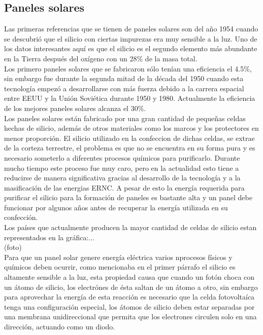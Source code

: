 \subsection{Paneles solares}
Las primeras referencias que se tienen de paneles solares son del año 1954 cuando se descubrió que el silicio con ciertas impurezas era muy sensible a la luz. Uno de los datos interesantes aquí es que el silicio es el segundo elemento más abundante en la Tierra después del oxígeno con un 28\% de la masa total\cite{panel:1}.\\

Los primero paneles solares que se fabricaron sólo tenían una eficiencia el 4.5\%, sin embargo fue durante la segunda mitad de la década del 1950 cuando esta tecnología empezó a desarrollarse con más fuerza debido a la carrera espacial entre EEUU y la Unión Soviética durante 1950 y 1980. Actualmente la eficiencia de los mejores paneles solares alcanza el 30\%\cite{panel:2}.\\

Los paneles solares están fabricado por una gran cantidad de pequeñas celdas hechas de silicio, además de otros materiales como los marcos y los protectores en menor proporción. El silicio utilizado en la confeccion de dichas celdas, se extrae de la corteza terrestre, el problema es que no se encuentra en su forma pura y es necesario someterlo a diferentes procesos químicos para purificarlo. Durante mucho tiempo este proceso fue muy caro, pero en la actualidad esto tiene a reducirse de manera significativa gracias al desarrollo de la tecnología y a la masificación de las energias ERNC. A pesar de esto la energía requerida para purificar el silicio para la formación de paneles es bastante alta y un panel debe funcionar por algunos años antes de recuperar la energía utilizada en su confección.\\

Los países que actualmente producen la mayor cantidad de celdas de silicio estan representados en la gráfica:...\\

(foto)\\

Para que un panel solar genere energía eléctrica varios nprocesos físicos y químicos deben ocurrir, como mencionaba en el primer párrafo el silicio es altamente sensible a la luz, esta propiedad causa que cuando un fotón choca con un átomo de silicio, los electrónes de ésta saltan de un átomo a otro, sin embargo para aprovechar la energía de esta reacción es necesario que la celda fotovoltaíca tenga una configuración especial, los átomos de silicio deben estar separadas por una membrana unidireccional que permita que los electrones circulen solo en una dirección, actuando como un diodo.\\

